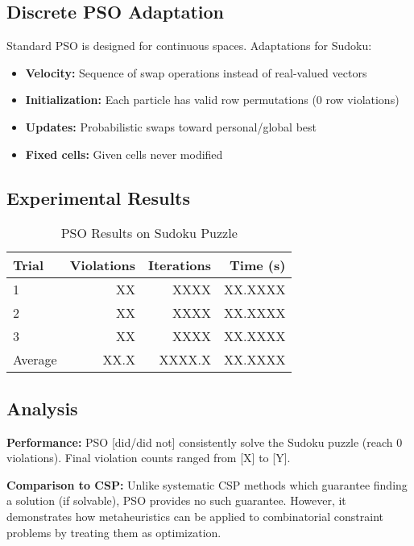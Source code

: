 \documentclass[letterpaper]{article}
\begin{document}
\subsection{Discrete PSO Adaptation}

Standard PSO is designed for continuous spaces. Adaptations for Sudoku:
\begin{itemize}
\item \textbf{Velocity:} Sequence of swap operations instead of real-valued vectors
\item \textbf{Initialization:} Each particle has valid row permutations (0 row violations)
\item \textbf{Updates:} Probabilistic swaps toward personal/global best
\item \textbf{Fixed cells:} Given cells never modified
\end{itemize}

\subsection{Experimental Results}


\begin{table}[h]
\centering
\caption{PSO Results on Sudoku Puzzle}
\label{tab:pso-sudoku}
\begin{tabular}{@{}lrrr@{}}
\toprule
Trial & Violations & Iterations & Time (s) \\
\midrule
1 & XX & XXXX & XX.XXXX \\
2 & XX & XXXX & XX.XXXX \\
3 & XX & XXXX & XX.XXXX \\
\midrule
Average & XX.X & XXXX.X & XX.XXXX \\
\bottomrule
\end{tabular}
\end{table}

\subsection{Analysis}


\textbf{Performance:} PSO [did/did not] consistently solve the Sudoku puzzle (reach 0 violations). Final violation counts ranged from [X] to [Y].

\textbf{Comparison to CSP:} Unlike systematic CSP methods which guarantee finding a solution (if solvable), PSO provides no such guarantee. However, it demonstrates how metaheuristics can be applied to combinatorial constraint problems by treating them as optimization.
\end{document}
